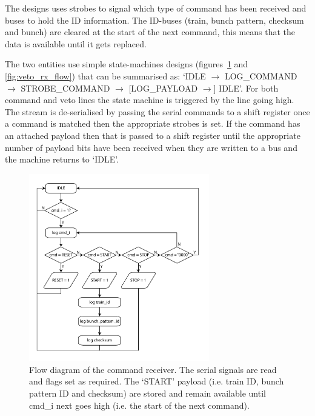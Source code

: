 The designs uses strobes to signal which type of command has been received and buses to hold the ID information. The ID-buses (train, bunch pattern, checksum and bunch) are cleared at the start of the next command, this means that the data is available until it gets replaced.
  
The two entities use simple state-machines designs (figures~\ref{fig:cmd_rx_flow} and \ref{fig:veto_rx_flow}) that can be summarised as: `IDLE \( \rightarrow \) LOG\_COMMAND \( \rightarrow \) STROBE\_COMMAND \( \rightarrow \) [LOG\_PAYLOAD \( \rightarrow \)] IDLE'. For both command and veto lines the state machine is triggered by the line going high. The stream is de-serialised by passing the serial commands to a shift register once a command is matched then the appropriate strobes is set. If the command has an attached payload then that is passed to a shift register until the appropriate number of payload bits have been received when they are written to a bus and the machine returns to `IDLE'.
\begin{figure}[htbp]
  \centering
  \includegraphics[width=0.7\textwidth]{images/pdfs/cmd_rx_flow.pdf}
  \caption{Flow diagram of the command receiver. The serial signals are read and flags set as required. The `START' payload (i.e. train ID, bunch pattern ID and checksum) are stored and remain available until cmd\_i next goes high (i.e. the start of the next command).}
  \label{fig:cmd_rx_flow}
\end{figure}
